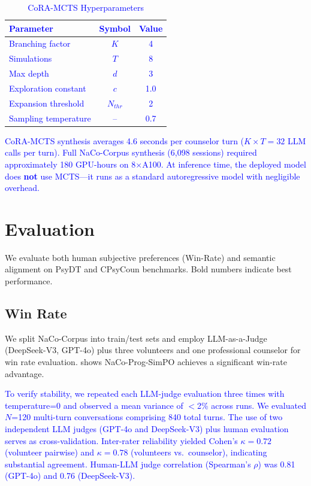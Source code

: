 \documentclass[lettersize,journal]{IEEEtran}
\newcommand{\blue}[1]{\textcolor{blue}{#1}}
\begin{document}
\blue{
\begin{table}[h]
\centering
\caption{CoRA-MCTS Hyperparameters}
\label{tab:mcts_params}
\begin{tabular}{lcc}
\toprule
Parameter & Symbol & Value \\
\midrule
Branching factor & $K$ & 4 \\
Simulations & $T$ & 8 \\
Max depth & $d$ & 3 \\
Exploration constant & $c$ & 1.0 \\
Expansion threshold & $N_{thr}$ & 2 \\
Sampling temperature & -- & 0.7 \\
\bottomrule
\end{tabular}
\end{table}
CoRA-MCTS synthesis averages 4.6 seconds per counselor turn ($K \times T = 32$ LLM calls per turn). Full NaCo-Corpus synthesis (6,098 sessions) required approximately 180 GPU-hours on 8$\times$A100. At inference time, the deployed model does \textbf{not} use MCTS---it runs as a standard autoregressive model with negligible overhead.
}

\section{Evaluation}

We evaluate both human subjective preferences (Win-Rate) and semantic alignment on PsyDT and CPsyCoun benchmarks. Bold numbers indicate best performance.

\subsection{Win Rate}
We split NaCo-Corpus into train/test sets and employ LLM-as-a-Judge (DeepSeek-V3, GPT-4o) plus three volunteers and one professional counselor for win rate evaluation.  shows NaCo-Prog-SimPO achieves a significant win-rate advantage.

\blue{To verify stability, we repeated each LLM-judge evaluation three times with temperature=0 and observed a mean variance of $<$2\% across runs. We evaluated $N$=120 multi-turn conversations comprising 840 total turns. The use of two independent LLM judges (GPT-4o and DeepSeek-V3) plus human evaluation serves as cross-validation. Inter-rater reliability yielded Cohen's $\kappa=0.72$ (volunteer pairwise) and $\kappa=0.78$ (volunteers vs.\ counselor), indicating substantial agreement. Human-LLM judge correlation (Spearman's $\rho$) was 0.81 (GPT-4o) and 0.76 (DeepSeek-V3).}
\end{document}
